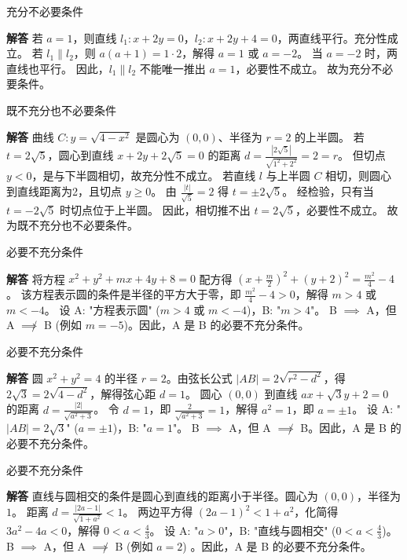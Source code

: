 \begin{solution}
    充分不必要条件

    \textbf{解答}
    若 $a=1$，则直线 $l_1: x+2y=0$，$l_2: x+2y+4=0$，两直线平行。充分性成立。
    若 $l_1 \parallel l_2$，则 $a(a+1) = 1 \cdot 2$，解得 $a=1$ 或 $a=-2$。
    当 $a=-2$ 时，两直线也平行。  因此，$l_1 \parallel l_2$ 不能唯一推出 $a=1$，必要性不成立。
    故为充分不必要条件。
\end{solution}

\begin{solution}
    既不充分也不必要条件

    \textbf{解答}
    曲线 $C: y=\sqrt{4-x^2}$ 是圆心为 $(0,0)$、半径为 $r=2$ 的上半圆。
    若 $t=2\sqrt{5}$，圆心到直线 $x+2y+2\sqrt{5}=0$ 的距离 $d = \frac{|2\sqrt{5}|}{\sqrt{1^2+2^2}}=2=r$。  但切点 $y<0$，是与下半圆相切，故充分性不成立。
    若直线 $l$ 与上半圆 $C$ 相切，则圆心到直线距离为2，且切点 $y \ge 0$。
    由 $\frac{|t|}{\sqrt{5}}=2$ 得 $t = \pm 2\sqrt{5}$。  经检验，只有当 $t=-2\sqrt{5}$ 时切点位于上半圆。  因此，相切推不出 $t=2\sqrt{5}$，必要性不成立。
    故为既不充分也不必要条件。
\end{solution}

\begin{solution}
    必要不充分条件

    \textbf{解答}
    将方程 $x^2+y^2+mx+4y+8=0$ 配方得 $(x+\frac{m}{2})^2 + (y+2)^2 = \frac{m^2}{4}-4$。
    该方程表示圆的条件是半径的平方大于零，即 $\frac{m^2}{4}-4 > 0$，解得 $m>4$ 或 $m<-4$。
    设 A: "方程表示圆" ($m>4$ 或 $m<-4$)，B: "$m>4$"。
    B $\implies$ A，但 A $\not\implies$ B (例如 $m=-5$)。因此，A 是 B 的必要不充分条件。
\end{solution}

\begin{solution}
    必要不充分条件

    \textbf{解答}
    圆 $x^2+y^2=4$ 的半径 $r=2$。由弦长公式 $|AB|=2\sqrt{r^2-d^2}$，得 $2\sqrt{3}=2\sqrt{4-d^2}$，解得弦心距 $d=1$。
    圆心 $(0,0)$ 到直线 $ax+\sqrt{3}y+2=0$ 的距离 $d = \frac{|2|}{\sqrt{a^2+3}}$。
    令 $d=1$，即 $\frac{2}{\sqrt{a^2+3}}=1$，解得 $a^2=1$，即 $a=\pm 1$。
    设 A: "$|AB|=2\sqrt{3}$" ($a=\pm 1$)，B: "$a=1$"。
    B $\implies$ A，但 A $\not\implies$ B。因此，A 是 B 的必要不充分条件。
\end{solution}

\begin{solution}
    必要不充分条件

    \textbf{解答}
    直线与圆相交的条件是圆心到直线的距离小于半径。圆心为 $(0,0)$，半径为 $1$。
    距离 $d = \frac{|2a-1|}{\sqrt{1+a^2}} < 1$。
    两边平方得 $(2a-1)^2 < 1+a^2$，化简得 $3a^2-4a<0$，解得 $0 < a < \frac{4}{3}$。
    设 A: "$a>0$"，B: "直线与圆相交" ($0<a<\frac{4}{3}$)。
    B $\implies$ A，但 A $\not\implies$ B (例如 $a=2$) 。因此，A 是 B 的必要不充分条件。
\end{solution}

